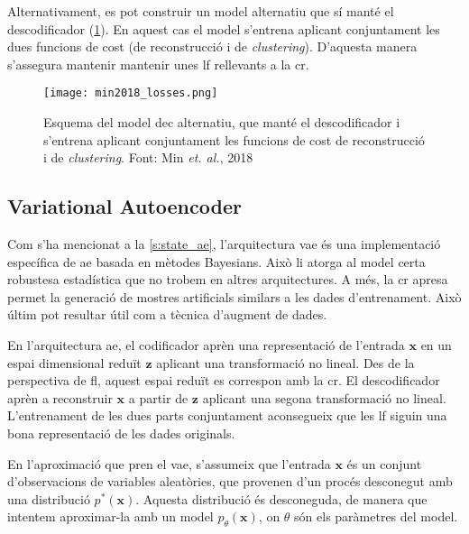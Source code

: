 \documentclass[CAT,BIB]{TFUOC}%
\begin{document}
        Alternativament,
        es pot construir un model alternatiu
        que sí manté el descodificador \citep{Min2018} (\cref{f:dec_min2018}).
        En aquest cas el model s'entrena aplicant conjuntament les dues funcions de cost
        (de reconstrucció i de \textit{clustering}).
        D'aquesta manera s'assegura mantenir mantenir unes \gls{lf} rellevants a la \gls{cr}.

        \begin{figure}
            \centering
            \texttt{[image: min2018\_losses.png]}
            \caption[Alternativa al DEC mantenint descodificador]{
                Esquema del model \gls{dec} alternatiu,
                que manté el descodificador
                i s'entrena aplicant conjuntament les funcions de cost
                de reconstrucció i de \textit{clustering}.
                Font: Min \textit{et. al.}, 2018 \citep{Min2018}
            }
            \label{f:dec_min2018}
        \end{figure}

    \subsection{Variational Autoencoder}
    \label{s:metodes_vae}

        Com s'ha mencionat a la \cref{s:state_ae},
        l'arquitectura \gls{vae} és una implementació específica de \gls{ae}
        basada en mètodes Bayesians.
        Això li atorga al model certa robustesa estadística
        que no trobem en altres arquitectures.
        A més,
        la \gls{cr} apresa permet la generació de mostres artificials
        similars a les dades d'entrenament.
        Això últim pot resultar útil com a tècnica d'augment de dades.

        En l'arquitectura \gls{ae},
        el codificador aprèn una representació de l'entrada $\mathbf{x}$
        en un espai dimensional reduït $\mathbf{z}$
        aplicant una transformació no lineal.
        Des de la perspectiva de \gls{fl},
        aquest espai reduït es correspon amb la \gls{cr}.
        El descodificador aprèn a reconstruir $\mathbf{x}$ a partir de $\mathbf{z}$
        aplicant una segona transformació no lineal.
        L'entrenament de les dues parts conjuntament
        aconsegueix que les \gls{lf} siguin una bona representació de les dades originals.

        En l'aproximació que pren el \gls{vae},
        s'assumeix que l'entrada $\mathbf{x}$ és un conjunt d'observacions de variables aleatòries,
        que provenen d'un procés desconegut
        amb una distribució $p^*(\mathbf{x})$.
        Aquesta distribució és desconeguda,
        de manera que intentem aproximar-la amb un model $p_\theta(\mathbf{x})$,
        on $\theta$ són els paràmetres del model.
\end{document}
